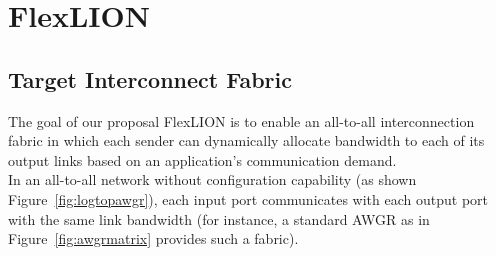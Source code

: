 \section{FlexLION}
\subsection{Target Interconnect Fabric}
The goal of our proposal FlexLION is to enable an all-to-all interconnection fabric in which each sender can dynamically allocate bandwidth to each of its output links based on an application's communication demand.\\
In an all-to-all network without configuration capability (as shown Figure~\ref{fig:logtopawgr}), each input port communicates with each output port with the same link bandwidth (for instance, a standard AWGR as in Figure~\ref{fig:awgrmatrix} provides such a fabric).
